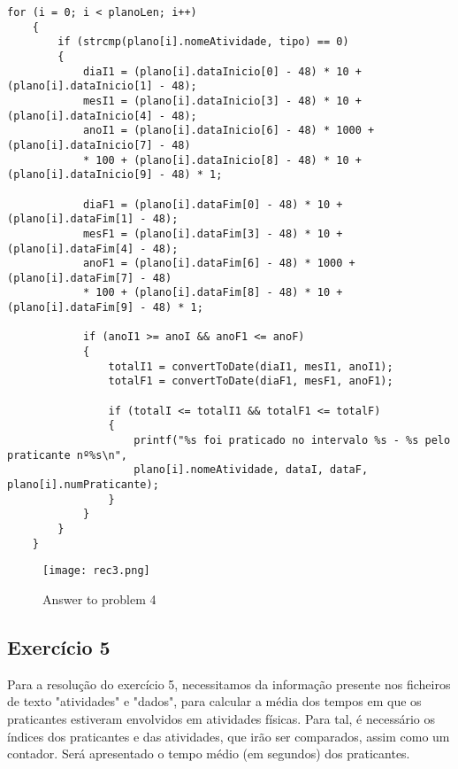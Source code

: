 \begin{lstlisting}[caption=Exemplo exercício 4]
for (i = 0; i < planoLen; i++)
    {
        if (strcmp(plano[i].nomeAtividade, tipo) == 0)
        {
            diaI1 = (plano[i].dataInicio[0] - 48) * 10 + (plano[i].dataInicio[1] - 48);
            mesI1 = (plano[i].dataInicio[3] - 48) * 10 + (plano[i].dataInicio[4] - 48);
            anoI1 = (plano[i].dataInicio[6] - 48) * 1000 + (plano[i].dataInicio[7] - 48) 
            * 100 + (plano[i].dataInicio[8] - 48) * 10 + (plano[i].dataInicio[9] - 48) * 1;

            diaF1 = (plano[i].dataFim[0] - 48) * 10 + (plano[i].dataFim[1] - 48);
            mesF1 = (plano[i].dataFim[3] - 48) * 10 + (plano[i].dataFim[4] - 48);
            anoF1 = (plano[i].dataFim[6] - 48) * 1000 + (plano[i].dataFim[7] - 48) 
            * 100 + (plano[i].dataFim[8] - 48) * 10 + (plano[i].dataFim[9] - 48) * 1;

            if (anoI1 >= anoI && anoF1 <= anoF)
            {
                totalI1 = convertToDate(diaI1, mesI1, anoI1);
                totalF1 = convertToDate(diaF1, mesF1, anoF1);

                if (totalI <= totalI1 && totalF1 <= totalF)
                {
                    printf("%s foi praticado no intervalo %s - %s pelo praticante nº%s\n",
                    plano[i].nomeAtividade, dataI, dataF, plano[i].numPraticante);
                }
            }
        }
    }
\end{lstlisting}

\begin{figure}[htbp]
\centering
\texttt{[image: rec3.png]}  %
\caption{Answer to problem 4}
\label{fig:ex4}
\end{figure}

\subsection{Exercício 5}
Para a resolução do exercício 5, necessitamos da informação presente nos ficheiros de texto "atividades" e "dados", para calcular a média dos tempos em que os praticantes estiveram envolvidos em atividades físicas. Para tal, é necessário os índices dos praticantes e das atividades, que irão ser comparados, assim como um contador. Será apresentado o tempo médio (em segundos) dos praticantes.


